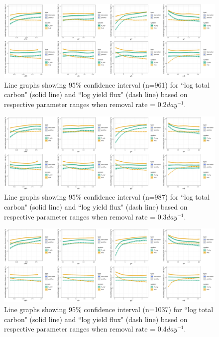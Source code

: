 \documentclass[../thesis.tex]{subfiles} %
\begin{document}
\begin{figure}[H]
    \centering
    \includegraphics[width=\linewidth]{../result/var_02.png}
    \caption[95\% distribution for $x=0.2day^{-1}$]{Line graphs showing 95\% confidence interval (n=961) for ``log total carbon" (solid line) and ``log yield flux" (dash line) based on respective parameter ranges when removal rate = 0.2$day^{-1}$.}
    \label{fig:v02}
\end{figure}

\begin{figure}[H]
    \centering
    \includegraphics[width=\linewidth]{../result/var_03.png}
    \caption[95\% distribution for $x=0.3day^{-1}$]{Line graphs showing 95\% confidence interval (n=987) for ``log total carbon" (solid line) and ``log yield flux" (dash line) based on respective parameter ranges when removal rate = 0.3$day^{-1}$.}
    \label{fig:v03}
\end{figure}

\begin{figure}[H]
    \centering
    \includegraphics[width=\linewidth]{../result/var_04.png}
    \caption[95\% distribution for $x=0.4day^{-1}$]{Line graphs showing 95\% confidence interval (n=1037) for ``log total carbon" (solid line) and ``log yield flux" (dash line) based on respective parameter ranges when removal rate = 0.4$day^{-1}$.}
    \label{fig:v04}
\end{figure}
\end{document}
